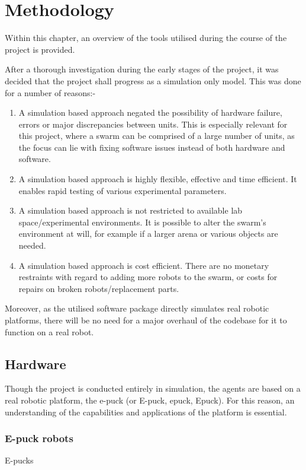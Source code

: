 \chapter{Methodology}
\label{chap:Methodology}

Within this chapter, an overview of the tools utilised during the course of the project is provided. 

After a thorough investigation during the early stages of the project, it was decided that the project shall progress as a simulation only model. This was done for a number of reasons:-

\begin{enumerate}
	\item  A simulation based approach negated the possibility of hardware failure, errors or major discrepancies between units. This is especially relevant for this project, where a swarm can be comprised of a large number of units, as the focus can lie with fixing software issues instead of both hardware and software.
	\item A simulation based approach is highly flexible, effective and time efficient. It enables rapid testing of various experimental parameters. 
	\item A simulation based approach is not restricted to available lab space/experimental environments. It is possible to alter the swarm's environment at will, for example if a larger arena or various objects are needed.
	\item A simulation based approach is cost efficient. There are no monetary restraints with regard to adding more robots to the swarm, or costs for repairs on broken robots/replacement parts.
\end{enumerate}
Moreover, as the utilised software package directly simulates real robotic platforms, there will be no need for a major overhaul of the codebase for it to function on a real robot.

\section{Hardware}

Though the project is conducted entirely in simulation, the agents are based on a real robotic platform, the e-puck (or E-puck, epuck, Epuck). For this reason, an understanding of the capabilities and applications of the platform is essential.

\subsection{E-puck robots}
E-pucks
